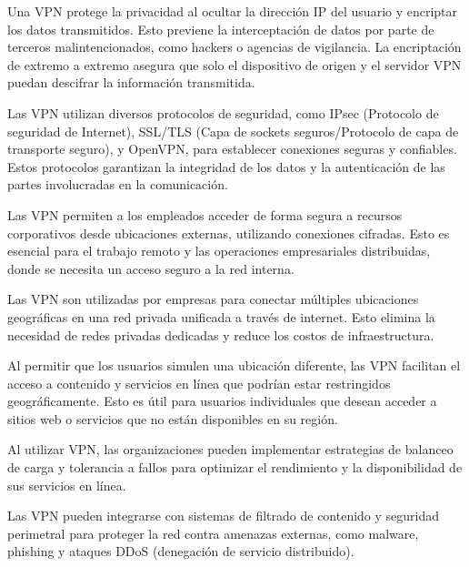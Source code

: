 Una VPN protege la privacidad al ocultar la dirección IP del usuario y encriptar los datos transmitidos. Esto previene la interceptación de datos por parte de terceros malintencionados, como hackers o agencias de vigilancia. La encriptación de extremo a extremo asegura que solo el dispositivo de origen y el servidor VPN puedan descifrar la información transmitida.

Las VPN utilizan diversos protocolos de seguridad, como IPsec (Protocolo de seguridad de Internet), SSL/TLS (Capa de sockets seguros/Protocolo de capa de transporte seguro), y OpenVPN, para establecer conexiones seguras y confiables. Estos protocolos garantizan la integridad de los datos y la autenticación de las partes involucradas en la comunicación.

Las VPN permiten a los empleados acceder de forma segura a recursos corporativos desde ubicaciones externas, utilizando conexiones cifradas. Esto es esencial para el trabajo remoto y las operaciones empresariales distribuidas, donde se necesita un acceso seguro a la red interna.

Las VPN son utilizadas por empresas para conectar múltiples ubicaciones geográficas en una red privada unificada a través de internet. Esto elimina la necesidad de redes privadas dedicadas y reduce los costos de infraestructura.

Al permitir que los usuarios simulen una ubicación diferente, las VPN facilitan el acceso a contenido y servicios en línea que podrían estar restringidos geográficamente. Esto es útil para usuarios individuales que desean acceder a sitios web o servicios que no están disponibles en su región.

Al utilizar VPN, las organizaciones pueden implementar estrategias de balanceo de carga y tolerancia a fallos para optimizar el rendimiento y la disponibilidad de sus servicios en línea.

Las VPN pueden integrarse con sistemas de filtrado de contenido y seguridad perimetral para proteger la red contra amenazas externas, como malware, phishing y ataques DDoS (denegación de servicio distribuido).


 




